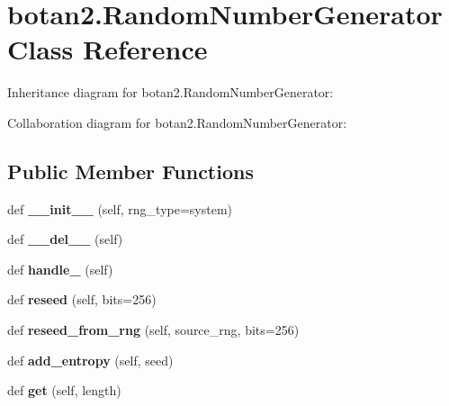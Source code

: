 \hypertarget{classbotan2_1_1_random_number_generator}{}\section{botan2.\+Random\+Number\+Generator Class Reference}
\label{classbotan2_1_1_random_number_generator}


Inheritance diagram for botan2.\+Random\+Number\+Generator\+:


Collaboration diagram for botan2.\+Random\+Number\+Generator\+:
\subsection*{Public Member Functions}
\begin{DoxyCompactItemize}
\item 
\mbox{\label{classbotan2_1_1_random_number_generator_a825df52c41c5a302b0b37e5302f704a1}} 
def {\bfseries \+\_\+\+\_\+init\+\_\+\+\_\+} (self, rng\+\_\+type=\textquotesingle{}system\textquotesingle{})
\item 
\mbox{\label{classbotan2_1_1_random_number_generator_a6f64766790545724a3a2c0469992474c}} 
def {\bfseries \+\_\+\+\_\+del\+\_\+\+\_\+} (self)
\item 
\mbox{\label{classbotan2_1_1_random_number_generator_aa94fb8042823e5f0fd723a91c084d53e}} 
def {\bfseries handle\+\_\+} (self)
\item 
\mbox{\label{classbotan2_1_1_random_number_generator_adba220881c4ef143aabc2b062ad325be}} 
def {\bfseries reseed} (self, bits=256)
\item 
\mbox{\label{classbotan2_1_1_random_number_generator_a773146d0989e6bd9e7d89c298424d685}} 
def {\bfseries reseed\+\_\+from\+\_\+rng} (self, source\+\_\+rng, bits=256)
\item 
\mbox{\label{classbotan2_1_1_random_number_generator_adc52f1b40a6ed2029910a303f8e315ba}} 
def {\bfseries add\+\_\+entropy} (self, seed)
\item 
\mbox{\label{classbotan2_1_1_random_number_generator_a6155d5cecd98a62d3ea4cee4cc9b6390}} 
def {\bfseries get} (self, length)
\end{DoxyCompactItemize}


